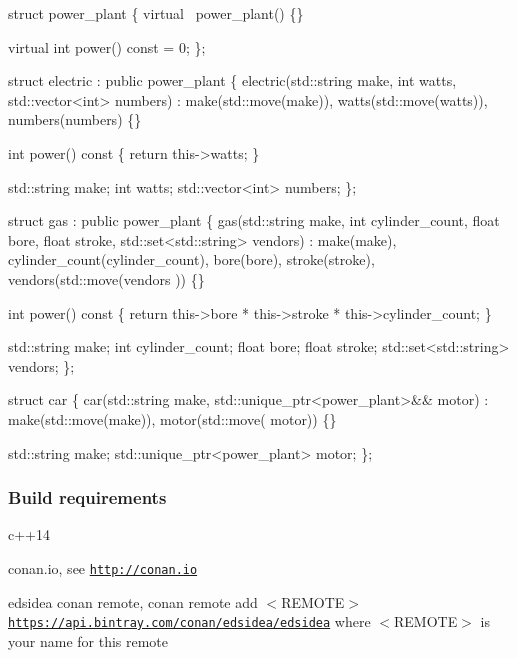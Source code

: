 \begin{DoxyCode}
\textcolor{keyword}{struct }power\_plant \{
    \textcolor{keyword}{virtual} ~power\_plant() \{\}

    \textcolor{keyword}{virtual} \textcolor{keywordtype}{int} power() \textcolor{keyword}{const} = 0;
\};

\textcolor{keyword}{struct }electric : \textcolor{keyword}{public} power\_plant \{
    electric(std::string make, \textcolor{keywordtype}{int} watts, std::vector<int> numbers)
        : make(std::move(make)), watts(std::move(watts)), numbers(numbers) \{\}

    \textcolor{keywordtype}{int} power()\textcolor{keyword}{ const }\{ \textcolor{keywordflow}{return} this->watts; \}

    std::string make;
    \textcolor{keywordtype}{int} watts;
    std::vector<int> numbers;
\};

\textcolor{keyword}{struct }gas : \textcolor{keyword}{public} power\_plant \{
    gas(std::string make, \textcolor{keywordtype}{int} cylinder\_count, \textcolor{keywordtype}{float} bore, \textcolor{keywordtype}{float} stroke, std::set<std::string> vendors)
        : make(make), cylinder\_count(cylinder\_count), bore(bore), stroke(stroke), vendors(std::move(vendors
      )) \{\}

    \textcolor{keywordtype}{int} power()\textcolor{keyword}{ const }\{ \textcolor{keywordflow}{return} this->bore * this->stroke * this->cylinder\_count; \}

    std::string make;
    \textcolor{keywordtype}{int} cylinder\_count;
    \textcolor{keywordtype}{float} bore;
    \textcolor{keywordtype}{float} stroke;
    std::set<std::string> vendors;
\};

\textcolor{keyword}{struct }car \{
    car(std::string make, std::unique\_ptr<power\_plant>&& motor) : make(std::move(make)), motor(std::move(
      motor)) \{\}

    std::string make;
    std::unique\_ptr<power\_plant> motor;
\};
\end{DoxyCode}
 \subsubsection*{Build requirements}


\begin{DoxyItemize}
\item c++14
\item conan.\+io, see \href{http://conan.io}{\tt http\+://conan.\+io}
\item edsidea conan remote, {\ttfamily conan remote add $<$R\+E\+M\+O\+TE$>$ \href{https://api.bintray.com/conan/edsidea/edsidea}{\tt https\+://api.\+bintray.\+com/conan/edsidea/edsidea}} where {\ttfamily $<$R\+E\+M\+O\+TE$>$} is your name for this remote
\end{DoxyItemize}

